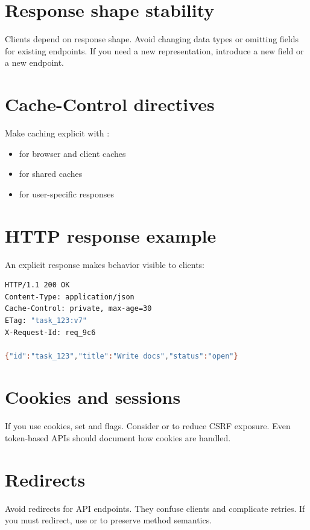 \section{Response shape stability}
Clients depend on response shape.
Avoid changing data types or omitting fields for existing endpoints.
If you need a new representation, introduce a new field or a new endpoint.

\section{Cache-Control directives}
Make caching explicit with :
\begin{itemize}[nosep]
  \item {} for browser and client caches
  \item {} for shared caches
  \item {} for user-specific responses
\end{itemize}

\section{HTTP response example}
An explicit response makes behavior visible to clients:
\begin{lstlisting}[language=Bash]
HTTP/1.1 200 OK
Content-Type: application/json
Cache-Control: private, max-age=30
ETag: "task_123:v7"
X-Request-Id: req_9c6

{"id":"task_123","title":"Write docs","status":"open"}
\end{lstlisting}

\section{Cookies and sessions}
If you use cookies, set  and  flags.
Consider  or  to reduce CSRF exposure.
Even token-based APIs should document how cookies are handled.

\section{Redirects}
Avoid redirects for API endpoints.
They confuse clients and complicate retries.
If you must redirect, use  or  to preserve method semantics.

